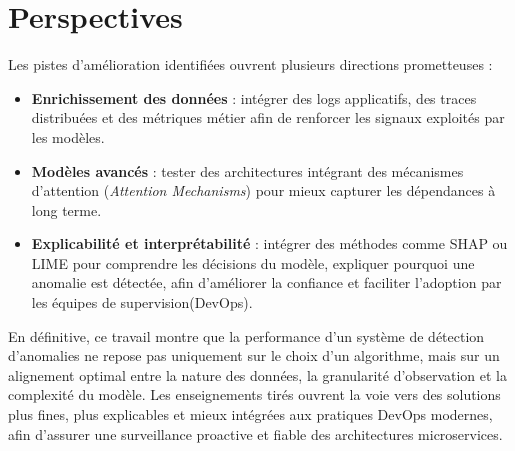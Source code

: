 \documentclass[a4paper,12pt]{report}
\begin{document}
\section*{Perspectives}
Les pistes d’amélioration identifiées ouvrent plusieurs directions prometteuses :
\begin{itemize}
    \item \textbf{Enrichissement des données} : intégrer des logs applicatifs, des traces distribuées et des métriques métier afin de renforcer les signaux exploités par les modèles.
    \item \textbf{Modèles avancés} : tester des architectures intégrant des mécanismes d’attention (\textit{Attention Mechanisms}) pour mieux capturer les dépendances à long terme.
    \item \textbf{Explicabilité et interprétabilité} : intégrer des méthodes comme SHAP ou LIME pour comprendre les décisions du modèle, expliquer pourquoi une anomalie est détectée, afin d’améliorer la confiance et faciliter l’adoption par les équipes de supervision(DevOps).\\
\end{itemize}

En définitive, ce travail montre que la performance d’un système de détection d’anomalies ne repose pas uniquement sur le choix d’un algorithme, mais sur un alignement optimal entre la nature des données, la granularité d’observation et la complexité du modèle. Les enseignements tirés ouvrent la voie vers des solutions plus fines, plus explicables et mieux intégrées aux pratiques DevOps modernes, afin d’assurer une surveillance proactive et fiable des architectures microservices.





\nocite{*}
\end{document}
